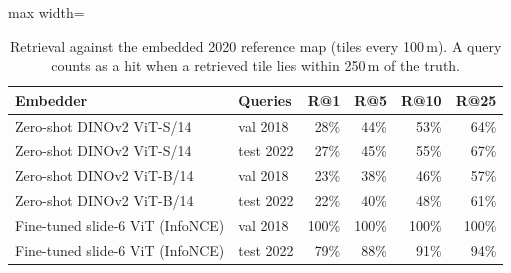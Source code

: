 \begin{table}[t]
\centering
\small
\caption{Retrieval against the embedded 2020 reference map (tiles every 100\,m). A query counts as a hit when a retrieved tile lies within 250\,m of the truth.}
\label{tab:retrieval}
\begin{adjustbox}{max width=\linewidth}
\begin{tabular}{llrrrr}
\toprule
Embedder & Queries & R@1 & R@5 & R@10 & R@25 \\
\midrule
Zero-shot DINOv2 ViT-S/14 & val 2018 & 28\% & 44\% & 53\% & 64\% \\
Zero-shot DINOv2 ViT-S/14 & test 2022 & 27\% & 45\% & 55\% & 67\% \\
Zero-shot DINOv2 ViT-B/14 & val 2018 & 23\% & 38\% & 46\% & 57\% \\
Zero-shot DINOv2 ViT-B/14 & test 2022 & 22\% & 40\% & 48\% & 61\% \\
Fine-tuned slide-6 ViT (InfoNCE) & val 2018 & 100\% & 100\% & 100\% & 100\% \\
Fine-tuned slide-6 ViT (InfoNCE) & test 2022 & 79\% & 88\% & 91\% & 94\% \\
\bottomrule
\end{tabular}
\end{adjustbox}
\end{table}
